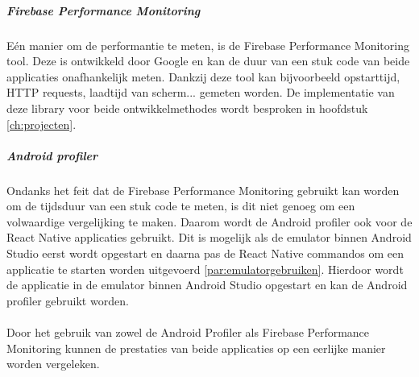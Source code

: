 \subparagraph{Firebase Performance Monitoring}
Eén manier om de performantie te meten, is de Firebase Performance Monitoring tool. 
Deze is ontwikkeld door Google en kan de duur van een stuk code van beide applicaties 
onafhankelijk meten. Dankzij deze tool kan bijvoorbeeld opstarttijd, HTTP requests, 
laadtijd van scherm... gemeten worden. De implementatie van deze library voor beide ontwikkelmethodes wordt besproken 
in hoofdstuk \ref{ch:projecten}.

\subparagraph{Android profiler}
Ondanks het feit dat de Firebase Performance Monitoring gebruikt kan worden om de tijdsduur 
van een stuk code te meten, is dit niet genoeg om een volwaardige vergelijking te 
maken. Daarom wordt de Android profiler ook voor de React Native applicaties 
gebruikt. Dit is mogelijk als de emulator binnen Android Studio eerst wordt opgestart 
en daarna pas de React Native commandos om een applicatie te starten worden uitgevoerd 
\ref{par:emulatorgebruiken}. Hierdoor wordt de applicatie in de emulator 
binnen Android Studio opgestart en kan de Android profiler gebruikt worden. 
\\\\
Door het gebruik van zowel de Android Profiler als Firebase Performance Monitoring 
kunnen de prestaties van beide applicaties op een eerlijke manier worden vergeleken.
